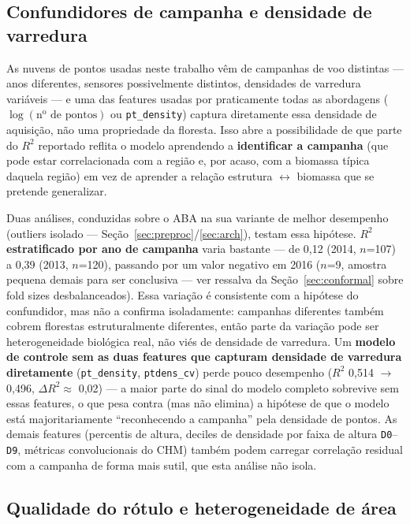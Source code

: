 \subsection{Confundidores de campanha e densidade de varredura}
\label{sec:confounders}

As nuvens de pontos usadas neste trabalho vêm de campanhas de voo distintas ---
anos diferentes, sensores possivelmente distintos, densidades de varredura
variáveis --- e uma das features usadas por praticamente todas as abordagens
($\log(\text{n}^{\text{o}}\text{ de pontos})$ ou \texttt{pt\_density}) captura
diretamente essa densidade de aquisição, não uma propriedade da floresta. Isso
abre a possibilidade de que parte do $R^2$ reportado reflita o modelo aprendendo a
\textbf{identificar a campanha} (que pode estar correlacionada com a região e, por
acaso, com a biomassa típica daquela região) em vez de aprender a relação
estrutura $\leftrightarrow$ biomassa que se pretende generalizar.

Duas análises, conduzidas sobre o ABA na sua variante de melhor desempenho
(outliers isolado --- Seção~\ref{sec:preproc}/\ref{sec:arch}), testam essa
hipótese. \textbf{$R^2$ estratificado por ano de campanha} varia bastante --- de
0,12 (2014, $n$=107) a 0,39 (2013, $n$=120), passando por um valor negativo em
2016 ($n$=9, amostra pequena demais para ser conclusiva --- ver ressalva da
Seção~\ref{sec:conformal} sobre fold sizes desbalanceados). Essa variação é
consistente com a hipótese do confundidor, mas não a confirma isoladamente:
campanhas diferentes também cobrem florestas estruturalmente diferentes, então
parte da variação pode ser heterogeneidade biológica real, não viés de densidade
de varredura. Um \textbf{modelo de controle sem as duas features que capturam
densidade de varredura diretamente} (\texttt{pt\_density}, \texttt{ptdens\_cv})
perde pouco desempenho ($R^2$ 0,514 $\rightarrow$ 0,496, $\Delta R^2 \approx$ 0,02)
--- a maior parte do sinal do modelo completo sobrevive sem essas features, o que
pesa contra (mas não elimina) a hipótese de que o modelo está majoritariamente
``reconhecendo a campanha'' pela densidade de pontos. As demais features
(percentis de altura, deciles de densidade por faixa de altura \texttt{D0}--\texttt{D9},
métricas convolucionais do CHM) também podem carregar correlação residual com a
campanha de forma mais sutil, que esta análise não isola.

\subsection{Qualidade do rótulo e heterogeneidade de área}

